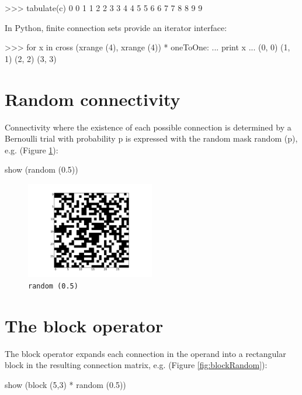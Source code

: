 \documentclass[a4paper,twoside]{report}
\newcommand{\expr}[1]{\lstinline|#1|}
\begin{document}
\begin{code}{}
  >>> tabulate(c)
  0       0
  1       1
  2       2
  3       3
  4       4
  5       5
  6       6
  7       7
  8       8
  9       9      
\end{code}
\pagebreak
In Python, finite connection sets provide an iterator interface:

\begin{code}{}
  >>> for x in cross (xrange (4), xrange (4)) * oneToOne:
  ...   print x
  ... 
  (0, 0)
  (1, 1)
  (2, 2)
  (3, 3)
\end{code}

\section{Random connectivity}

Connectivity where the existence of each possible connection is
determined by a Bernoulli trial with probability p is expressed with
the random mask random (p), e.g. (Figure \ref{fig:random}):

\begin{code}{}
  show (random (0.5))
\end{code}

\begin{figure}
  \begin{center}
    \includegraphics[width=0.5\textwidth]{figures/random}
    \caption[Random mask]{\label{fig:random}
      \expr{random (0.5)}
    }
  \end{center}
\end{figure}

\section{The block operator}
The block operator expands each connection in the operand into a
rectangular block in the resulting connection matrix, e.g. (Figure \ref{fig:blockRandom}):

\begin{code}{}
  show (block (5,3) * random (0.5))
\end{code}
\end{document}
